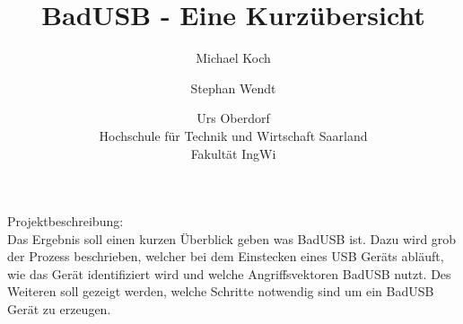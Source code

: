 \documentclass[ a4paper, 12pt, ]{article}
\title{BadUSB - Eine Kurzübersicht}
\author{Michael Koch \and{Stephan Wendt} \and{Urs Oberdorf}\\Hochschule für Technik und Wirtschaft Saarland\\Fakultät IngWi}
\date{} %
\begin{document}
\maketitle
Projektbeschreibung:\\
Das Ergebnis soll einen kurzen Überblick geben was BadUSB ist. Dazu wird grob der Prozess beschrieben,
welcher bei dem Einstecken eines USB Geräts abläuft, wie das Gerät identifiziert wird und welche 
Angriffsvektoren BadUSB nutzt. Des Weiteren soll gezeigt werden, welche Schritte notwendig sind um ein
BadUSB Gerät zu erzeugen.
\end{document}
